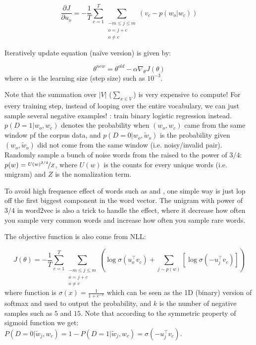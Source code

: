 \begin{equation}
\frac{\partial J}{\partial u_o} = -\frac{1}{T} \sum_{c=1}^{T} \sum_{ \substack{-m \le j \le m \\ o=j+c \\ o \ne c}} \left(v_c - p(w_o | w_c)\right)
\end{equation}

Iteratively update equation (na\"ive version) is given by:

\begin{equation}
\theta^{new} = \theta^{old} - \alpha \nabla_\theta J(\theta)
\end{equation}
where $\alpha$ is the learning size (step size) such as $10^{-3}$.

Note that the summation over $|V|$ ($\sum_{x \in V}$) is very expensive to compute!
For every training step, instead of looping over the entire vocabulary, we can just sample several negative examples!
: train binary logistic regression instead.
$p(D=1|w_o,w_c)$ denotes the probability when $(w_o,w_c)$ came from the same window pf the corpus data, and $p(D=0|w_o,\tilde{w}_o)$ is the probability given $(w_o,\tilde{w}_o)$ did not come from the same window (i.e. noisy/invalid pair).
Randomly sample a bunch of noise words from the  raised to the power of $3/4$: $p(w) = \nicefrac{U(w)^{3/4}}{Z}$, where $U(w)$ is the counts for every unique words (i.e. unigram) and $Z$ is the nomalization term.

To avoid high frequence effect of words such as  and , one simple way is just lop off the first biggest component in the word vector.
The unigram with power of $3/4$ in word2vec is also a trick to handle the effect, where it decrease how often you sample very common words and increase how often you sample rare words.

The objective function is also come from NLL: 

\begin{equation}
J(\theta) = - \frac{1}{T} \sum_{c=1}^T \sum_{ \substack{-m \le j \le m \\ o=j+c \\ o \ne c}} \left( \log \sigma \left( u_o^\top v_c \right) + \sum_{j \sim p(w)} \left[ \log \sigma \left(-u_j^\top v_c\right) \right] \right)
\end{equation}
where  function is $\sigma(x) = \frac{1}{1 + e^{-x}}$ which can be seen as the 1D (binary) version of softmax and used to output the probability, and $k$ is the number of negative samples such as $5$ and $15$.
Note that according to the symmetric property of sigmoid function we get: $P(D=0|\tilde{w}_j,w_c) = 1 - P(D=1|\tilde{w}_j,w_c) = \sigma \left(-u_j^\top v_c\right)$.

